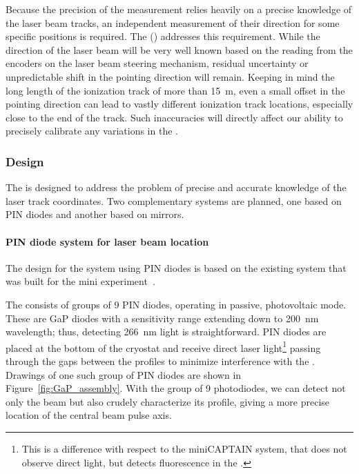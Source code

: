 \label{sec:calib-laser-pos}
Because the precision of the \efield measurement relies heavily on a precise knowledge of the laser beam tracks, an independent measurement of their direction for some specific positions is required. The %
 ()
addresses this requirement. While the direction of the laser beam will be very well known based on the reading from the encoders on the laser beam steering mechanism,  residual uncertainty or unpredictable shift in the pointing direction will remain. 
Keeping in mind the long length of the ionization track of more than \SI{15}{\m}, even a small offset in the pointing direction can lead to vastly different ionization track locations, especially close to the end of the track. Such inaccuracies will directly affect our ability to precisely calibrate any variations in the \efield.

\subsubsection{Design}
The  is designed to address the problem of precise and accurate knowledge of the laser track coordinates. 
Two complementary systems are planned, one based on PIN diodes and another based on mirrors.

\paragraph{PIN diode system for laser beam location}

The design for the system using PIN diodes is based on the existing system that was built for the mini experiment~\cite{Berns:2013usa}.


The  consists of groups of \num{9} PIN diodes, operating in passive, photovoltaic mode. These are GaP diodes with a sensitivity range extending down to  \SI{200}{\nano\m} wavelength; thus, detecting \SI{266}{\nano\m} light is straightforward. %
PIN diodes are placed at the bottom of the cryostat and receive direct laser light\footnote{This is a difference with respect to the miniCAPTAIN system, that does not observe direct light, but detects fluorescence in the \frfour.} passing through the gaps between the  profiles to minimize interference with the . Drawings of one such group of PIN diodes are shown in Figure~\ref{fig:GaP_assembly}. With the group of \num{9} photodiodes, we can detect not only the beam but also crudely characterize its profile, giving a more precise location of the central beam pulse axis. 


